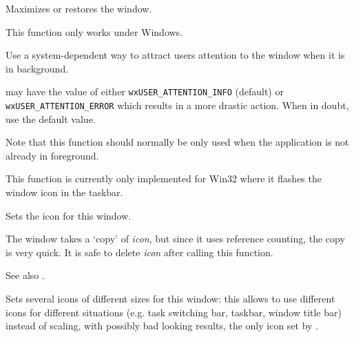 
Maximizes or restores the window.




This function only works under Windows.




\label{wxtoplevelwindowrequestuserattention}


Use a system-dependent way to attract users attention to the window when it is
in background.

 may have the value of either \texttt{wxUSER\_ATTENTION\_INFO}
(default) or \texttt{wxUSER\_ATTENTION\_ERROR} which results in a more drastic
action. When in doubt, use the default value.

Note that this function should normally be only used when the application is
not already in foreground.

This function is currently only implemented for Win32 where it flashes the
window icon in the taskbar.


\label{wxtoplevelwindowseticon}


Sets the icon for this window.




The window takes a `copy' of {\it icon}, but since it uses reference
counting, the copy is very quick. It is safe to delete {\it icon} after
calling this function.

See also .


\label{wxtoplevelwindowseticons}


Sets several icons of different sizes for this window: this allows to use
different icons for different situations (e.g. task switching bar, taskbar,
window title bar) instead of scaling, with possibly bad looking results, the
only icon set by .

